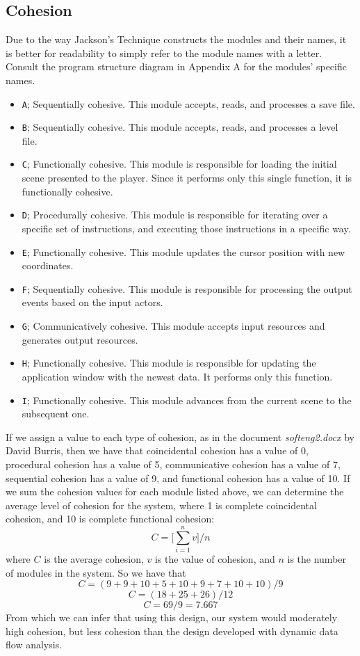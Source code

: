 \documentclass{article}
\begin{document}
		\subsection{Cohesion}
			Due to the way Jackson's Technique constructs the modules and their names, it is better for readability to simply refer to the module names with a letter. Consult the program structure diagram in Appendix A for the modules' specific names. 
			\begin{itemize}
				\item \texttt{A}; Sequentially cohesive. This module accepts, reads, and processes a save file. 
				\item \texttt{B}; Sequentially cohesive. This module accepts, reads, and processes a level file. 
				\item \texttt{C}; Functionally cohesive. This module is responsible for loading the initial scene presented to the player. Since it performs only this single function, it is functionally cohesive. 
				\item \texttt{D}; Procedurally cohesive. This module is responsible for iterating over a specific set of instructions, and executing those instructions in a specific way. 
				\item \texttt{E}; Functionally cohesive. This module updates the cursor position with new coordinates. 
				\item \texttt{F}; Sequentially cohesive. This module is responsible for processing the output events based on the input actors. 
				\item \texttt{G}; Communicatively cohesive. This module accepts input resources and generates output resources. 
				\item \texttt{H}; Functionally cohesive. This module is responsible for updating the application window with the newest data. It performs only this function. 
				\item \texttt{I}; Functionally cohesive. This module advances from the current scene to the subsequent one. 
			\end{itemize}
			If we assign a value to each type of cohesion, as in the document \emph{softeng2.docx} by David Burris, then we have that coincidental cohesion has a value of 0, procedural cohesion has a value of 5, communicative cohesion has a value of 7, sequential cohesion has a value of 9, and functional cohesion has a value of 10. If we sum the cohesion values for each module listed above, we can determine the average level of cohesion for the system, where 1 is complete coincidental cohesion, and 10 is complete functional cohesion:
			$$C = \Bigg[\sum_{i=1}^{n}v\Bigg] /n$$
			where $C$ is the average cohesion, $v$ is the value of cohesion, and $n$ is the number of modules in the system. So we have that
			$$C = (9 + 9 + 10 + 5 + 10 + 9 + 7 + 10 + 10)/9$$
			$$C = (18 + 25 + 26)/12$$
			$$C = 69/9 = 7.667$$
			From which we can infer that using this design, our system would moderately high cohesion, but less cohesion than the design developed with dynamic data flow analysis. 
\end{document}
